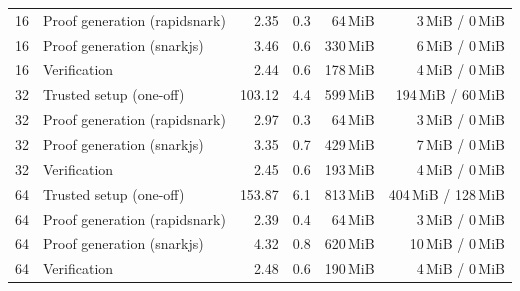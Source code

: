 \begin{table}[t]
{\begin{tabular}{|r|l|r|r|r|r|}
16 & Proof generation (rapidsnark) & 2.35 & 0.3 & 64\,MiB & 3\,MiB / 0\,MiB \\
16 & Proof generation (snarkjs) & 3.46 & 0.6 & 330\,MiB & 6\,MiB / 0\,MiB \\
16 & Verification & 2.44 & 0.6 & 178\,MiB & 4\,MiB / 0\,MiB \\
\hline
32 & Trusted setup (one-off) & 103.12 & 4.4 & 599\,MiB & 194\,MiB / 60\,MiB \\
32 & Proof generation (rapidsnark) & 2.97 & 0.3 & 64\,MiB & 3\,MiB / 0\,MiB \\
32 & Proof generation (snarkjs) & 3.35 & 0.7 & 429\,MiB & 7\,MiB / 0\,MiB \\
32 & Verification & 2.45 & 0.6 & 193\,MiB & 4\,MiB / 0\,MiB \\
\hline
64 & Trusted setup (one-off) & 153.87 & 6.1 & 813\,MiB & 404\,MiB / 128\,MiB \\
64 & Proof generation (rapidsnark) & 2.39 & 0.4 & 64\,MiB & 3\,MiB / 0\,MiB \\
64 & Proof generation (snarkjs) & 4.32 & 0.8 & 620\,MiB & 10\,MiB / 0\,MiB \\
64 & Verification & 2.48 & 0.6 & 190\,MiB & 4\,MiB / 0\,MiB \\
\hline
\end{tabular}}
\end{table}
